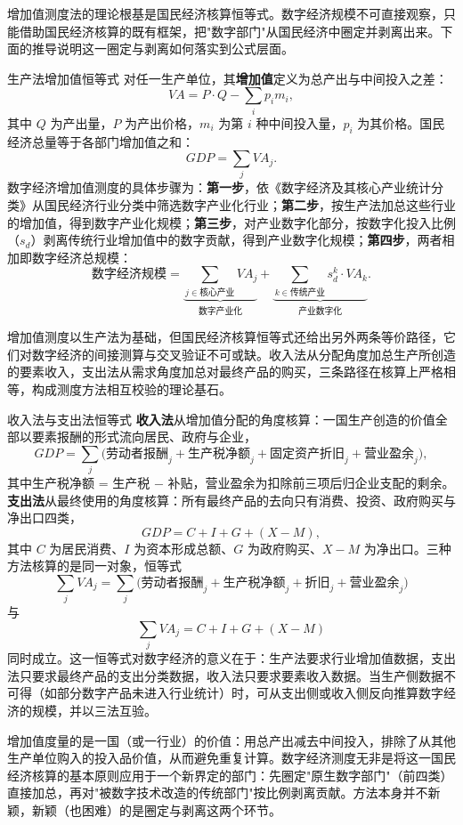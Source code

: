 增加值测度法的理论根基是国民经济核算恒等式。数字经济规模不可直接观察，只能借助国民经济核算的既有框架，把"数字部门"从国民经济中圈定并剥离出来。下面的推导说明这一圈定与剥离如何落实到公式层面。

\begin{derivation}{生产法增加值恒等式}{}
对任一生产单位，其\textbf{增加值}定义为总产出与中间投入之差：
\[
VA = P \cdot Q - \sum_i p_i m_i,
\]
其中 $Q$ 为产出量，$P$ 为产出价格，$m_i$ 为第 $i$ 种中间投入量，$p_i$ 为其价格。国民经济总量等于各部门增加值之和：
\[
GDP = \sum_j VA_j.
\]
数字经济增加值测度的具体步骤为：\textbf{第一步}，依《数字经济及其核心产业统计分类》从国民经济行业分类中筛选数字产业化行业；\textbf{第二步}，按生产法加总这些行业的增加值，得到数字产业化规模；\textbf{第三步}，对产业数字化部分，按数字化投入比例（$s_d$）剥离传统行业增加值中的数字贡献，得到产业数字化规模；\textbf{第四步}，两者相加即数字经济总规模：
\[
\text{数字经济规模} = \underbrace{\sum_{j \in \text{核心产业}} VA_j}_{\text{数字产业化}} + \underbrace{\sum_{k \in \text{传统产业}} s_d^k \cdot VA_k}_{\text{产业数字化}}.
\]
\end{derivation}

增加值测度以生产法为基础，但国民经济核算恒等式还给出另外两条等价路径，它们对数字经济的间接测算与交叉验证不可或缺。收入法从分配角度加总生产所创造的要素收入，支出法从需求角度加总对最终产品的购买，三条路径在核算上严格相等，构成测度方法相互校验的理论基石。

\begin{derivation}{收入法与支出法恒等式}{}
\textbf{收入法}从增加值分配的角度核算：一国生产创造的价值全部以要素报酬的形式流向居民、政府与企业，
\[
GDP = \sum_j \big(\text{劳动者报酬}_j + \text{生产税净额}_j + \text{固定资产折旧}_j + \text{营业盈余}_j\big),
\]
其中生产税净额 = 生产税 $-$ 补贴，营业盈余为扣除前三项后归企业支配的剩余。\textbf{支出法}从最终使用的角度核算：所有最终产品的去向只有消费、投资、政府购买与净出口四类，
\[
GDP = C + I + G + (X - M),
\]
其中 $C$ 为居民消费、$I$ 为资本形成总额、$G$ 为政府购买、$X-M$ 为净出口。三种方法核算的是同一对象，恒等式
\[
\sum_j VA_j = \sum_j \big(\text{劳动者报酬}_j + \text{生产税净额}_j + \text{折旧}_j + \text{营业盈余}_j\big)
\]
与
\[
\sum_j VA_j = C + I + G + (X - M)
\]
同时成立。这一恒等式对数字经济的意义在于：生产法要求行业增加值数据，支出法只要求最终产品的支出分类数据，收入法只要求要素收入数据。当生产侧数据不可得（如部分数字产品未进入行业统计）时，可从支出侧或收入侧反向推算数字经济的规模，并以三法互验。
\end{derivation}

增加值度量的是一国（或一行业）的价值：用总产出减去中间投入，排除了从其他生产单位购入的投入品价值，从而避免重复计算。数字经济测度无非是将这一国民经济核算的基本原则应用于一个新界定的部门：先圈定"原生数字部门"（前四类）直接加总，再对"被数字技术改造的传统部门"按比例剥离贡献。方法本身并不新颖，新颖（也困难）的是圈定与剥离这两个环节。

